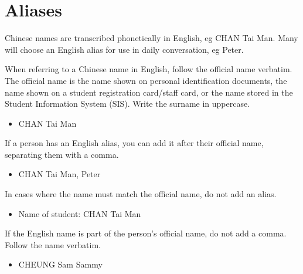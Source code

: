 \documentclass[11pt,a4paper]{book}
\newcommand{\cmark}{{\color{green(html/cssgreen)}\checkmark}}%
\begin{document}
		\section{Aliases}
		Chinese names are transcribed phonetically in English, eg CHAN Tai Man. Many will choose an English alias for use in daily conversation, eg Peter.\par
		When referring to a Chinese name in English, follow the official name verbatim. The official name is the name shown on personal identification documents, the name shown on a student registration card/staff card, or the name stored in the Student Information System (SIS). Write the surname in uppercase.
		{\firasans \begin{mdframed}[backgroundcolor=aliceblue] \begin{itemize}[label=\cmark]
			\item  CHAN Tai Man
		\end{itemize} \end{mdframed} }
		If a person has an English alias, you can add it after their official name, separating them with a comma.
		{\firasans \begin{mdframed}[backgroundcolor=aliceblue] \begin{itemize}[label=\cmark]
			\item CHAN Tai Man, Peter
		\end{itemize} \end{mdframed} }
		In cases where the name must match the official name, do not add an alias.
		{\firasans \begin{mdframed}[backgroundcolor=aliceblue] \begin{itemize}[label=\cmark]
			\item Name of student: CHAN Tai Man
		\end{itemize} \end{mdframed} }
		If the English name is part of the person's official name, do not add a comma. Follow the name verbatim.
		{\firasans \begin{mdframed}[backgroundcolor=aliceblue] \begin{itemize}[label=\cmark]
			\item CHEUNG Sam Sammy
		\end{itemize} \end{mdframed} }
	\newpage
\end{document}
